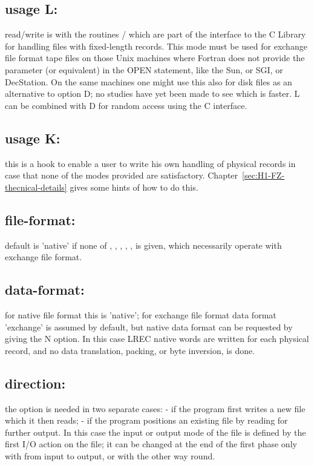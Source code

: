 \subsection*{usage L:}

read/write is with the routines / which are part of the
interface to the C Library for handling files with fixed-length records.
This mode must be used for exchange file format tape files on those
Unix machines where Fortran does not provide the parameter
 (or equivalent) in the OPEN statement,
like the Sun, or SGI, or DecStation.
On the same machines one might use this also for disk files as
an alternative to option D; no studies have yet been made to
see which is faster.
L can be combined with D for random access using the C interface.

\subsection*{usage K:}

this is a hook to enable a user to write his own handling of physical
records in case that none of the modes provided are satisfactory.
Chapter~\ref{sec:H1-FZ-thecnical-details} gives some hints of how to do this.

\subsection*{file-format:}

default is 'native' if none of 
, , , , ,
 is given,
which necessarily operate with exchange file format.

\subsection*{data-format:}

for native file format this is 'native';
for exchange file format data format 'exchange' is assumed by default,
but native data format can be requested by giving the N option.
In this case LREC native words are written for each physical record,
and no data translation, packing, or byte inversion, is done.

\subsection*{direction:}

the option  is needed in two separate cases:
   - if the program first writes a new file which it then reads;
   - if the program positions an existing file by reading
     for further output.
In this case the input or output mode of the file is defined
by the first I/O action on the file;
it can be changed at the end of the first phase only with 
from input to output, or with  the other way round.

